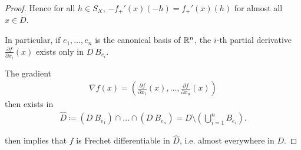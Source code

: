 \begin{proof}
  Hence for all $h \in S_X$, $-f_+'(x)(-h) = f_+'(x)(h)$ for almost all $x \in D$.

  In particular, if $e_1, \ldots, e_n$ is the canonical basis of $\mathbb{R}^n$, the $i$-th partial derivative $\frac{\partial f} {\partial x_i} (x)$ exists only in $D \ B_{e_i}$.

  The gradient
  \begin{align*}
    \nabla f(x) = \left( \frac{\partial f} {\partial x_1} (x), \ldots, \frac{\partial f} {\partial x_n} (x) \right)
  \end{align*}
  then exists in
  \begin{align*}
    \hat D \coloneqq (D \ B_{e_1}) \cap \ldots \cap (D \ B_{e_n}) = D \setminus \left( \bigcup_{i=1}^n B_{e_i} \right).
  \end{align*}

   then implies that $f$ is Frechet differentiable in $\hat D$, i.e. almost everywhere in $D$.
\end{proof}
